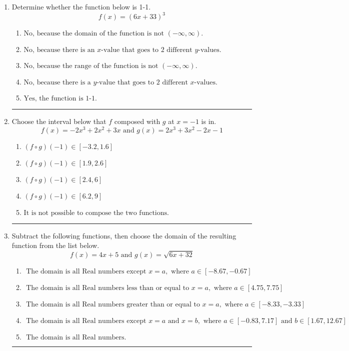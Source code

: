 \documentclass[14pt]{extbook}
\newcommand{\litem}[1]{\item#1\hspace*{-1cm}\rule{\textwidth}{0.4pt}}
\begin{document}
\begin{enumerate}
\litem{
Determine whether the function below is 1-1.\[ f(x) = (6 x + 33)^3 \]\begin{enumerate}[label=\Alph*.]
\item \( \text{No, because the domain of the function is not $(-\infty, \infty)$.} \)
\item \( \text{No, because there is an $x$-value that goes to 2 different $y$-values.} \)
\item \( \text{No, because the range of the function is not $(-\infty, \infty)$.} \)
\item \( \text{No, because there is a $y$-value that goes to 2 different $x$-values.} \)
\item \( \text{Yes, the function is 1-1.} \)

\end{enumerate} }
\litem{
Choose the interval below that $f$ composed with $g$ at $x=-1$ is in.\[ f(x) = -2x^{3} +2 x^{2} +3 x \text{ and } g(x) = 2x^{3} +3 x^{2} -2 x -1 \]\begin{enumerate}[label=\Alph*.]
\item \( (f \circ g)(-1) \in [-3.2, 1.6] \)
\item \( (f \circ g)(-1) \in [1.9, 2.6] \)
\item \( (f \circ g)(-1) \in [2.4, 6] \)
\item \( (f \circ g)(-1) \in [6.2, 9] \)
\item \( \text{It is not possible to compose the two functions.} \)

\end{enumerate} }
\litem{
Subtract the following functions, then choose the domain of the resulting function from the list below.\[ f(x) = 4x + 5 \text{ and } g(x) = \sqrt{6x+32}  \]\begin{enumerate}[label=\Alph*.]
\item \( \text{ The domain is all Real numbers except } x = a, \text{ where } a \in [-8.67, -0.67] \)
\item \( \text{ The domain is all Real numbers less than or equal to } x = a, \text{ where } a \in [4.75, 7.75] \)
\item \( \text{ The domain is all Real numbers greater than or equal to } x = a, \text{ where } a \in [-8.33, -3.33] \)
\item \( \text{ The domain is all Real numbers except } x = a \text{ and } x = b, \text{ where } a \in [-0.83, 7.17] \text{ and } b \in [1.67, 12.67] \)
\item \( \text{ The domain is all Real numbers. } \)


\end{enumerate}}
\end{enumerate}
\end{document}

